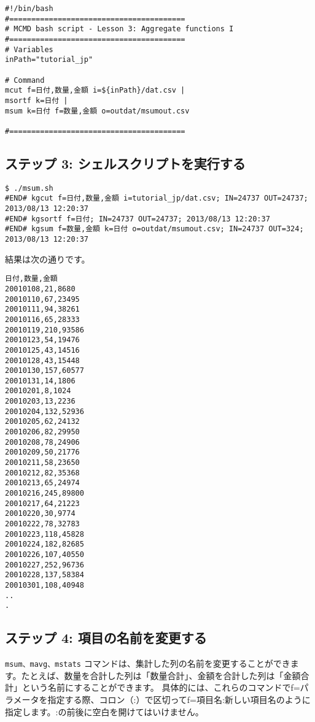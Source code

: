 \begin{verbatim}
#!/bin/bash
#========================================
# MCMD bash script - Lesson 3: Aggregate functions I
#========================================
# Variables
inPath="tutorial_jp"

# Command 
mcut f=日付,数量,金額 i=${inPath}/dat.csv |
msortf k=日付 |
msum k=日付 f=数量,金額 o=outdat/msumout.csv

#========================================
\end{verbatim}

\subsection{ステップ 3: シェルスクリプトを実行する}

\begin{verbatim}
$ ./msum.sh
#END# kgcut f=日付,数量,金額 i=tutorial_jp/dat.csv; IN=24737 OUT=24737; 2013/08/13 12:20:37
#END# kgsortf f=日付; IN=24737 OUT=24737; 2013/08/13 12:20:37
#END# kgsum f=数量,金額 k=日付 o=outdat/msumout.csv; IN=24737 OUT=324; 2013/08/13 12:20:37
\end{verbatim}

\noindent
結果は次の通りです。

\begin{verbatim}
日付,数量,金額
20010108,21,8680
20010110,67,23495
20010111,94,38261
20010116,65,28333
20010119,210,93586
20010123,54,19476
20010125,43,14516
20010128,43,15448
20010130,157,60577
20010131,14,1806
20010201,8,1024
20010203,13,2236
20010204,132,52936
20010205,62,24132
20010206,82,29950
20010208,78,24906
20010209,50,21776
20010211,58,23650
20010212,82,35368
20010213,65,24974
20010216,245,89800
20010217,64,21223
20010220,30,9774
20010222,78,32783
20010223,118,45828
20010224,182,82685
20010226,107,40550
20010227,252,96736
20010228,137,58384
20010301,108,40948
..
.
\end{verbatim}

\subsection{ステップ 4: 項目の名前を変更する}

\verb|msum、mavg、mstats| コマンドは、集計した列の名前を変更することができます。たとえば、数量を合計した列は「数量合計」、金額を合計した列は「金額合計」という名前にすることができます。
具体的には、これらのコマンドでf=パラメータを指定する際、コロン（:）で区切ってf=項目名:新しい項目名のように指定します。:の前後に空白を開けてはいけません。\\

